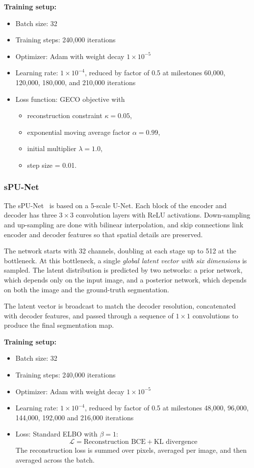 \documentclass{article}
\begin{document}
\textbf{Training setup:}  
\begin{itemize}
  \item Batch size: 32
  \item Training steps: 240{,}000 iterations
  \item Optimizer: Adam with weight decay $1 \times 10^{-5}$
  \item Learning rate: $1 \times 10^{-4}$, reduced by factor of 0.5 at milestones 60{,}000, 120{,}000, 180{,}000, and 210{,}000 iterations
  \item Loss function: GECO objective with  
  \begin{itemize}
    \item reconstruction constraint $\kappa = 0.05$,  
    \item exponential moving average factor $\alpha = 0.99$,  
    \item initial multiplier $\lambda = 1.0$,  
    \item step size = 0.01.  
  \end{itemize}
\end{itemize}

\subsubsection{sPU-Net}
  
The sPU-Net~\cite{Kohl2018} is based on a 5-scale U-Net. Each block of the encoder and decoder has three $3 \times 3$ convolution layers with ReLU activations. Down-sampling and up-sampling are done with bilinear interpolation, and skip connections link encoder and decoder features so that spatial details are preserved.  

The network starts with 32 channels, doubling at each stage up to 512 at the bottleneck. At this bottleneck, a single \emph{global latent vector with six dimensions} is sampled. The latent distribution is predicted by two networks: a prior network, which depends only on the input image, and a posterior network, which depends on both the image and the ground-truth segmentation.  

The latent vector is broadcast to match the decoder resolution, concatenated with decoder features, and passed through a sequence of $1 \times 1$ convolutions to produce the final segmentation map. 

\textbf{Training setup:}
\begin{itemize}
  \item Batch size: 32
  \item Training steps: 240,000 iterations
  \item Optimizer: Adam with weight decay $1 \times 10^{-5}$
  \item Learning rate: $1 \times 10^{-4}$, reduced by factor of 0.5 at milestones 48{,}000, 96{,}000, 144{,}000, 192{,}000 and 216{,}000 iterations
  \item Loss: Standard ELBO with $\beta = 1$:
  \[
    \mathcal{L} = \text{Reconstruction BCE} + \text{KL divergence}
  \]
  The reconstruction loss is summed over pixels, averaged per image, and then averaged across the batch.
\end{itemize}
\end{document}
